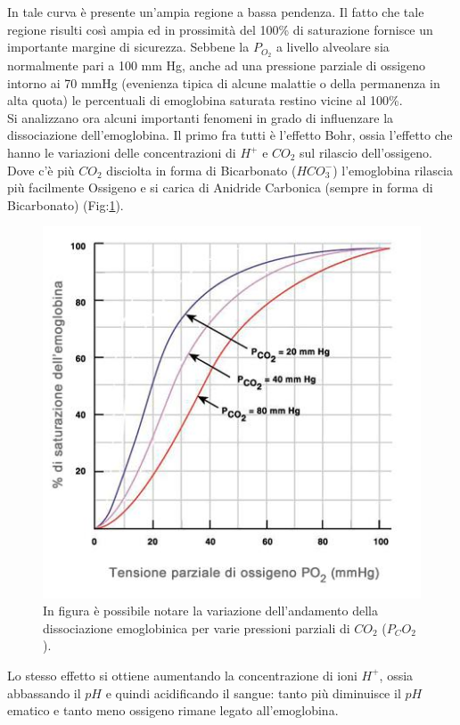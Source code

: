 \documentclass[12pt,a4paper, twoside, openright]{report}
\begin{document}
In tale curva è presente un'ampia regione a bassa pendenza. 
Il fatto che tale regione risulti così ampia ed in prossimità del 100\% di saturazione fornisce un importante margine di sicurezza. 
Sebbene la $P_{O_2}$ a livello alveolare sia normalmente pari a 100 mm Hg, anche ad una pressione parziale di ossigeno intorno ai 70 mmHg (evenienza tipica di alcune malattie o della permanenza in alta quota) le percentuali di emoglobina saturata restino vicine al 100\%. 
\\Si analizzano ora alcuni importanti fenomeni in grado di influenzare la dissociazione dell'emoglobina. 
Il primo fra tutti è l'effetto Bohr, ossia l'effetto che hanno le variazioni delle concentrazioni di $H^+$ e $CO_2$ sul rilascio dell'ossigeno. 
Dove c'è più $CO_2$ disciolta in forma di Bicarbonato ($HCO_3^-$) l'emoglobina rilascia più facilmente Ossigeno e si carica di Anidride Carbonica (sempre in forma di Bicarbonato) (Fig:\ref{fig:CO2}). 
\begin{figure}[h!]
    \centering
    \includegraphics[width=\textwidth]{emoglobina-C02.jpeg}
    \caption{In figura è possibile notare la variazione dell'andamento della 	 		 			 dissociazione emoglobinica per varie pressioni parziali di $CO_2$ 							 ($P_CO_2$).}
    \label{fig:CO2}
\end{figure}
Lo stesso effetto si ottiene aumentando la concentrazione di ioni $H^+$, ossia abbassando il $pH$ e quindi acidificando il sangue: tanto più diminuisce il $pH$ ematico e tanto meno ossigeno rimane legato all'emoglobina. 
\end{document}
